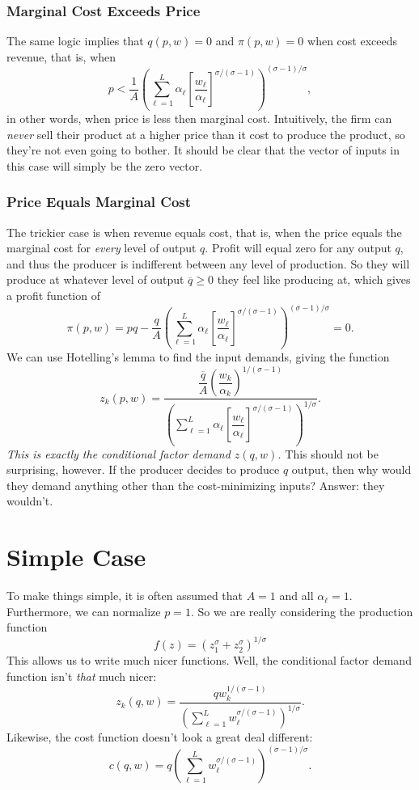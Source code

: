 \documentclass[12pt]{article}
\theoremstyle{definition}
\begin{document}
\subsubsection{Marginal Cost Exceeds Price}
The same logic implies that $q(p,w)=0$ and $\pi(p,w)=0$ when cost exceeds revenue, that is, when 
	\[
		 p <  \frac{1}{A}  \left( \sum_{\ell=1}^L \alpha_{\ell} \left[ \frac{w_{\ell}}{\alpha_{\ell}} \right]^{\sigma / (\sigma - 1)} \right)^{(\sigma  - 1)/\sigma},
	\]
in other words, when price is less then marginal cost. Intuitively, the firm can \emph{never} sell their product at a higher price than it cost to produce the product, so they're not even going to bother.  It should be clear that the vector of inputs in this case will simply be the zero vector.	
	
	
\subsubsection{Price Equals Marginal Cost}
The trickier case is when revenue equals cost, that is, when the price equals the marginal cost for \emph{every} level of output $q$. Profit will equal zero for any output $q$, and thus the producer is indifferent between any level of production. So they will produce at whatever level of output $\overline{q} \geq 0$ they feel like producing at, which gives a profit function of
	\[	\pi(p,w)= pq	 - \frac{q}{A}  \left( \sum_{\ell=1}^L \alpha_{\ell} \left[ \frac{w_{\ell}}{\alpha_{\ell}} \right]^{\sigma / (\sigma - 1)} \right)^{(\sigma  - 1)/\sigma}=0.	\]
We can use Hotelling's lemma to find the input demands, giving the function
\[
	 z_k(p,w) = \frac{  \dfrac{\overline{q}}{A} \left(\dfrac{w_k}{\alpha_k}\right)^{1 / (\sigma - 1)}}{ \left( \sum_{\ell=1}^L \alpha_{\ell} \left[ \dfrac{w_{\ell}}{\alpha_{\ell}} \right]^{\sigma / (\sigma - 1)} \right)^{1 / \sigma}}.
\]
\emph{This is exactly the conditional factor demand $z(q, w)$.} This should not be surprising, however. If the producer decides to produce $q$ output, then why would they demand anything other than the cost-minimizing inputs? Answer: they wouldn't. 



	
\section{Simple Case}
To make things simple, it is often assumed that $A=1$ and all $\alpha_{\ell}=1$. Furthermore, we can normalize $p=1$. So we are really considering the production function
	\[f(z)=(z_1^\sigma + z_2^\sigma)^{1 / \sigma}	\]
This allows us to write much nicer functions. Well, the conditional factor demand function isn't \emph{that} much nicer:
	\[ z_k(q,w)  =\frac{q w_k^{1 / (\sigma - 1)} }{\left( \sum_{\ell=1}^L  w_{\ell}^{\sigma / (\sigma - 1)} \right) ^{1 / \sigma}}.
	\]
Likewise, the cost function doesn't look a great deal different:
	\[ c(q, w) = q  \left( \sum_{\ell=1}^L w_{\ell} ^{\sigma / (\sigma - 1)} \right)^{(\sigma  - 1)/\sigma}.\]
\end{document}

